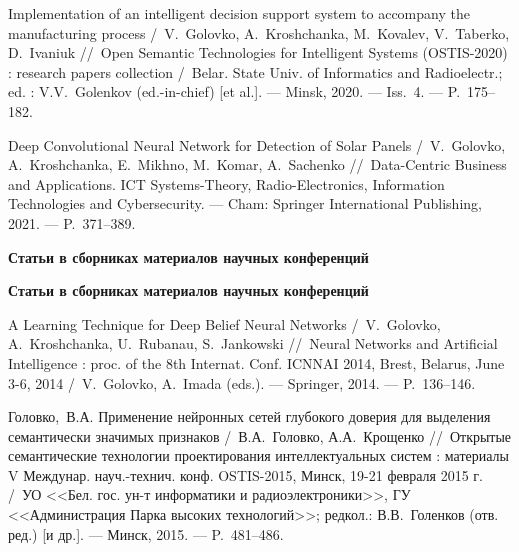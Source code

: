 Implementation of an intelligent decision support system to accompany the manufacturing process /~V.~Golovko, A.~Kroshchanka, M.~Kovalev, V.~Taberko, D.~Ivaniuk
\newblock //~Open Semantic Technologies for Intelligent Systems (OSTIS-2020) : research papers collection
\newblock /~Belar. State Univ. of Informatics and Radioelectr.; ed. : V.V.~Golenkov (ed.-in-chief) [et al.]. ---
\newblock Minsk, 2020. ---
\newblock Iss.~4. ---
\newblock P.~175--182.

Deep Convolutional Neural Network for Detection of Solar Panels /~V.~Golovko, A.~Kroshchanka, E.~Mikhno, M.~Komar, A.~Sachenko
\newblock //~Data-Centric Business and Applications. ICT Systems-Theory, Radio-Electronics, Information Technologies and Cybersecurity. ---
\newblock Cham: Springer International Publishing, 2021. ---
\newblock P.~371--389.

\ifx\isabstract\undefined 
\begin{center}
\vspace{3mm}
{\bf Статьи в сборниках материалов научных конференций}
\vspace{3mm}
\end{center}
\else
\vspace{2mm}
{\bf Статьи в сборниках материалов научных конференций}
\vspace{2mm}
\fi

A Learning Technique for Deep Belief Neural Networks /~V.~Golovko, A.~Kroshchanka, U.~Rubanau, S.~Jankowski
\newblock //~Neural Networks and Artificial Intelligence : proc. of the 8th Internat. Conf. ICNNAI 2014, Brest, Belarus, June 3-6, 2014
\newblock /~V.~Golovko, A.~Imada (eds.). ---
\newblock Springer, 2014. ---
\newblock P.~136--146.

Головко,~В.А. Применение нейронных сетей глубокого доверия для выделения семантически значимых признаков /~В.А.~Головко, А.А.~Крощенко
\newblock //~Открытые семантические технологии проектирования интеллектуальных систем : материалы V Междунар. науч.-технич. конф. OSTIS-2015, Минск, 19-21 февраля 2015 г.
\newblock /~УО <<Бел. гос. ун-т информатики и радиоэлектроники>>, ГУ <<Администрация Парка высоких технологий>>; редкол.: В.В.~Голенков (отв. ред.) [и др.]. ---
\newblock Минск, 2015. ---
\newblock P.~481--486.


